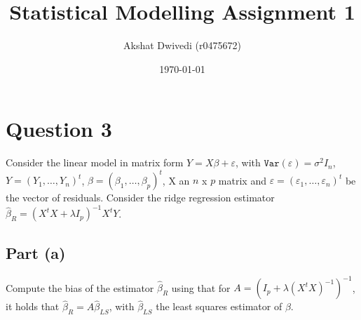 \documentclass[paper=a4, fontsize=11pt]{scrartcl} %
\title{Statistical Modelling Assignment 1}
\author{Akshat Dwivedi (r0475672)}
\date{\today}
\numberwithin{equation}{section} %
\begin{document}
\maketitle

\section*{Question 3}

Consider the linear model in matrix form $Y = X\beta + \varepsilon$, with $\texttt{Var}(\varepsilon) = \sigma^2 I_n$, $Y = (Y_1, \ldots, Y_n)^t$, $\beta = (\beta_1, \ldots, \beta_p)^t$, X an $n$ x $p$ matrix and $\varepsilon = (\varepsilon_1, \ldots, \varepsilon_n)^t$ be the vector of residuals. Consider the ridge regression estimator $\hat{\beta}_R = (X^tX + \lambda I_p)^{-1} X^t Y$.

\subsection*{Part (a)}

Compute the bias of the estimator $\hat{\beta}_R$ using that for $A = (I_p + \lambda(X^t X)^{-1})^{-1}$, it holds that $\hat{\beta}_R = A \hat{\beta}_{LS}$, with $\hat{\beta}_{LS}$ the least squares estimator of $\beta$.
\end{document}
